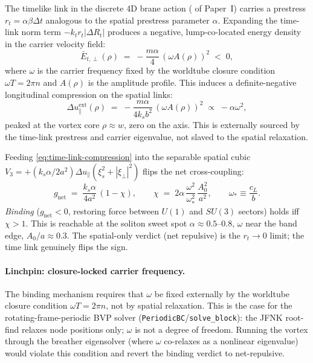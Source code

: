 The timelike link in the discrete 4D brane action ( of Paper~I)
carries a prestress $r_t = \alpha\beta\Delta t$ analogous to the spatial prestress parameter
$\alpha$.
Expanding the time-link norm term $-k_t r_t|\Delta R_t|$ produces a negative, lump-co-located
energy density in the carrier velocity field:
\begin{equation}
  \bar E_{t,\perp}(\rho)
  \;=\; -\frac{m\alpha}{4}\,(\omega A(\rho))^2 \;<\; 0,
  \label{eq:time-link-energy}
\end{equation}
where $\omega$ is the carrier frequency fixed by the worldtube closure condition
$\omega T = 2\pi n$ and $A(\rho)$ is the amplitude profile.
This induces a definite-negative longitudinal compression on the spatial links:
\begin{equation}
  \Delta u_\parallel^{\mathrm{ext}}(\rho)
  \;=\; -\frac{m\alpha}{4k_s b^2}\,(\omega A(\rho))^2
  \;\propto\; -\alpha\omega^2,
  \label{eq:time-link-compression}
\end{equation}
peaked at the vortex core $\rho\approx w$, zero on the axis.
This is externally sourced by the time-link prestress and carrier eigenvalue, not slaved to the
spatial relaxation.

Feeding \eqref{eq:time-link-compression} into the separable spatial cubic $V_3=+(k_s\alpha/2a^2)
\Delta u_\parallel(\xi_s^2+|\xi_\perp|^2)$ flips the net cross-coupling:
\begin{equation}
  g_{\mathrm{net}}
  \;=\; \frac{k_s\alpha}{4a^2}\,(1-\chi),
  \qquad
  \chi \;=\; 2\alpha\,\frac{\omega^2}{\omega_*^2}\,\frac{A_0^2}{a^2},
  \qquad
  \omega_* \equiv \frac{c_L}{b}.
  \label{eq:binding-condition}
\end{equation}
\emph{Binding} ($g_{\mathrm{net}}<0$, restoring force between $U(1)$ and $SU(3)$ sectors) holds
iff $\chi>1$.
This is reachable at the soliton sweet spot $\alpha\approx 0.5$--$0.8$, $\omega$ near the band
edge, $A_0/a\approx 0.3$.
The spatial-only verdict (net repulsive) is the $r_t\to 0$ limit; the time link genuinely flips
the sign.

\paragraph{Linchpin: closure-locked carrier frequency.}
The binding mechanism requires that $\omega$ be fixed externally by the worldtube closure
condition $\omega T=2\pi n$, not by spatial relaxation.
This is the case for the rotating-frame-periodic BVP solver (\texttt{PeriodicBC}/\texttt{solve\_block}):
the JFNK root-find relaxes node positions only; $\omega$ is not a degree of freedom.
Running the vortex through the breather eigensolver (where $\omega$ co-relaxes as a nonlinear
eigenvalue) would violate this condition and revert the binding verdict to net-repulsive.

